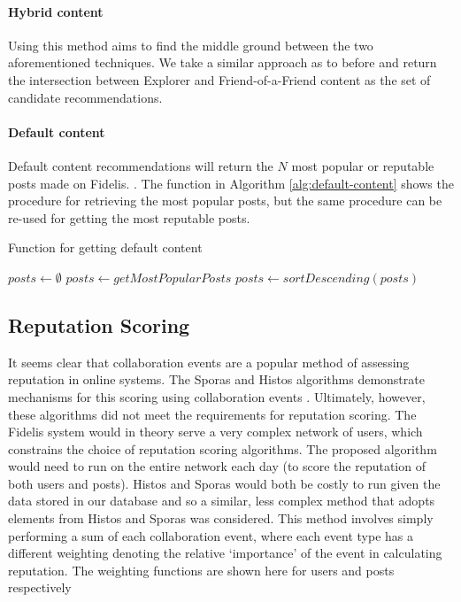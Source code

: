 \paragraph{Hybrid content} Using this method aims to find the middle ground between the two aforementioned techniques. We take a similar approach as to before and return the intersection between Explorer and Friend-of-a-Friend content as the set of candidate recommendations.

\paragraph{Default content} Default content recommendations will return the $N$ most popular or reputable posts made on Fidelis. . The function in Algorithm \ref{alg:default-content} shows the procedure for retrieving the most popular posts, but the same procedure can be re-used for getting the most reputable posts.

\begin{algorithm}
\caption{Function for getting default content}
\label{alg:default-content}
\begin{algorithmic}[1]
	\State $posts\gets \emptyset$
	\State $posts\gets getMostPopularPosts$
	\State $posts\gets sortDescending(posts)$
	\State {}
\EndFunction
\end{algorithmic}
\end{algorithm}

\subsection{Reputation Scoring}
It seems clear that collaboration events are a popular method of assessing reputation in online systems. The Sporas and Histos algorithms demonstrate mechanisms for this scoring using collaboration events \cite{mcnally2013} \cite{zacharia2000}. Ultimately, however, these algorithms did not meet the requirements for reputation scoring. The Fidelis system would in theory serve a very complex network of users, which constrains the choice of reputation scoring algorithms. The proposed algorithm would need to run on the entire network each day (to score the reputation of both users and posts). Histos and Sporas would both be costly to run given the data stored in our database and so a similar, less complex method that adopts elements from Histos and Sporas was considered. This method involves simply performing a sum of each collaboration event, where each event type has a different weighting denoting the relative `importance' of the event in calculating reputation. The weighting functions are shown here for users and posts respectively

